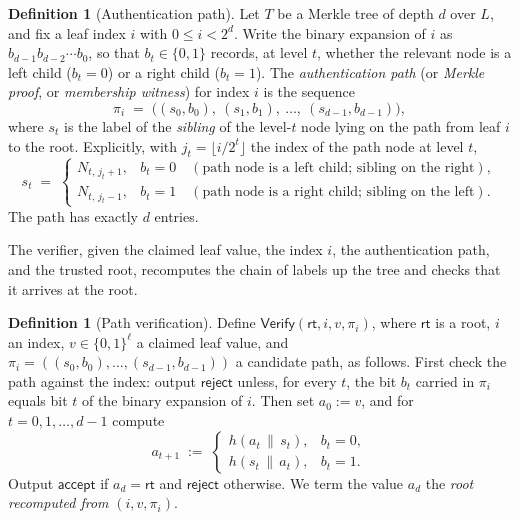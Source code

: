 \documentclass[11pt,a4paper]{article}
\theoremstyle{definition}
\newtheorem{definition}[theorem]{Definition}
\theoremstyle{remark}
\begin{document}
\begin{definition}[Authentication path]\label{merkle:def-authpath}
Let \(T\) be a Merkle tree of depth \(d\) over \(L\), and fix a leaf index \(i\) with \(0 \le i < 2^d\). Write the binary expansion of \(i\) as \(b_{d-1} b_{d-2} \cdots b_0\), so that \(b_t \in \{0,1\}\) records, at level \(t\), whether the relevant node is a left child (\(b_t = 0\)) or a right child (\(b_t = 1\)). The \emph{authentication path} (or \emph{Merkle proof}, or \emph{membership witness}) for index \(i\) is the sequence
\[
\pi_i \;=\; \bigl( (s_0, b_0),\ (s_1, b_1),\ \dots,\ (s_{d-1}, b_{d-1}) \bigr),
\]
where \(s_t\) is the label of the \emph{sibling} of the level-\(t\) node lying on the path from leaf \(i\) to the root. Explicitly, with \(j_t = \lfloor i / 2^t \rfloor\) the index of the path node at level \(t\),
\[
s_t \;=\;
\begin{cases}
N_{t,\, j_t + 1}, & b_t = 0 \quad(\text{path node is a left child; sibling on the right}),\\[2pt]
N_{t,\, j_t - 1}, & b_t = 1 \quad(\text{path node is a right child; sibling on the left}).
\end{cases}
\]
The path has exactly \(d\) entries.
\end{definition}

The verifier, given the claimed leaf value, the index \(i\), the authentication path, and the trusted root, recomputes the chain of labels up the tree and checks that it arrives at the root.

\begin{definition}[Path verification]\label{merkle:def-verify}
Define \(\mathsf{Verify}(\mathsf{rt}, i, v, \pi_i)\), where \(\mathsf{rt}\) is a root, \(i\) an index, \(v \in \{0,1\}^\ell\) a claimed leaf value, and \(\pi_i = ((s_0,b_0),\dots,(s_{d-1},b_{d-1}))\) a candidate path, as follows. First check the path against the index: output \(\mathsf{reject}\) unless, for every \(t\), the bit \(b_t\) carried in \(\pi_i\) equals bit \(t\) of the binary expansion of \(i\). Then set \(a_0 := v\), and for \(t = 0, 1, \dots, d-1\) compute
\[
a_{t+1} \;:=\;
\begin{cases}
h(a_t \,\|\, s_t), & b_t = 0,\\[2pt]
h(s_t \,\|\, a_t), & b_t = 1.
\end{cases}
\tag{$\dagger$}\label{merkle:eq-fold}
\]
Output \(\mathsf{accept}\) if \(a_d = \mathsf{rt}\) and \(\mathsf{reject}\) otherwise. We term the value \(a_d\) the \emph{root recomputed from} \((i, v, \pi_i)\).
\end{definition}
\end{document}
